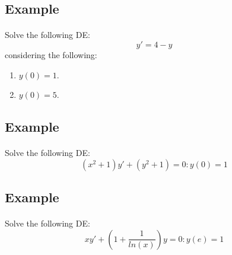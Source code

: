 \subsection{Example}
\begin{frame}{
    \insertsectionhead}
    \framesubtitle{\insertsubsectionhead}
    Solve the following DE:
        \begin{equation*} \tag{13}
            y' = 4 - y
        \end{equation*}
    considering the following:
        \begin{enumerate}
            \item ${y(0) = 1}$.
            \item ${y(0) = 5}$.
        \end{enumerate}
\end{frame}

\subsection{Example}
\begin{frame}{
    \insertsectionhead}
    \framesubtitle{\insertsubsectionhead}
    Solve the following DE:
        \begin{equation*} \tag{14}
            (x^2 + 1)y' + (y^2 + 1) = 0 : y(0) = 1
        \end{equation*}
        \newline\newline\newline\newline\newline\newline
\end{frame}

\subsection{Example}
\begin{frame}{
    \insertsectionhead}
    \framesubtitle{\insertsubsectionhead}
    Solve the following DE:
        \begin{equation*} \tag{15}
            xy' + (1 + \frac{1}{ln(x)})y = 0 : y(e) = 1
        \end{equation*}
        \newline\newline\newline\newline\newline\newline
\end{frame}

